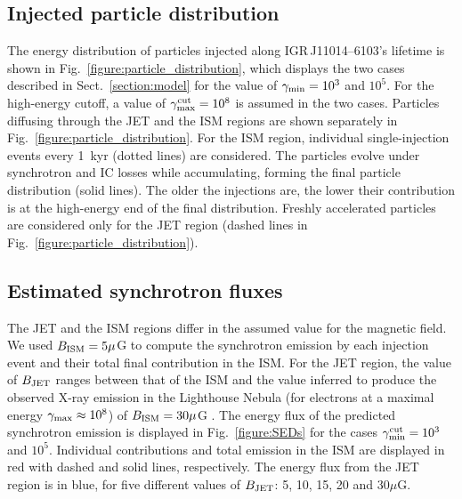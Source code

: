 \documentclass[letter]{aa}
\newcommand{\IGR}{IGR\,J11014--6103}
\begin{document}



\subsection{Injected particle distribution}

The energy distribution of particles injected along \IGR's lifetime is shown in Fig.~\ref{figure:particle_distribution}, which displays the two cases described in Sect.~\ref{section:model} for the value of $\gamma_{\rm min} = 10^{3}$ and $10^{5}$. For the high-energy cutoff, a value of $\gamma_{\rm max}^{ \rm cut} = 10^8$ is assumed in the two cases. Particles diffusing through the JET and the ISM regions are shown separately in Fig.~\ref{figure:particle_distribution}. For the ISM region, individual single-injection events every 1~kyr (dotted lines) are considered. The particles evolve under synchrotron and IC losses while accumulating, forming the final particle distribution (solid lines). The older the injections are, the lower their contribution is at the high-energy end of the final distribution. Freshly accelerated particles are considered only for the JET region (dashed lines in Fig.~\ref{figure:particle_distribution}).

\subsection{Estimated synchrotron fluxes}

The JET and the ISM regions differ in the assumed value for the magnetic field. We used $B_{\rm ISM} = 5 \mu$G to compute the synchrotron emission by each injection event and their total final contribution in the ISM. For the JET region, the value of $B_{\rm JET}$ ranges between that of the ISM and the value inferred to produce the observed X-ray emission in the Lighthouse Nebula (for electrons at a maximal energy $\gamma_{\rm max} \approx 10^8$) of $B_{\rm ISM} = 30 \mu$G \citep{Pavan2014}. The energy flux of the predicted synchrotron emission is displayed in Fig.~\ref{figure:SEDs} for the cases $\gamma_{\rm min}^{\rm cut} = 10^3$ and $10^5$. Individual contributions and total emission in the ISM are displayed in red with dashed and solid lines, respectively. The energy flux from the JET region is in blue, for five different values of $B_{\rm JET}$: 5, 10, 15, 20 and 30$\mu$G.
\end{document}
